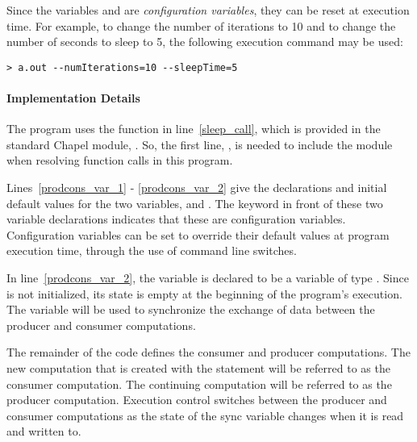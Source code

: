 Since the variables  and  are 
{\em configuration variables}, they can be reset at execution time.
For example, to change the number of iterations to 10
and to change the number of seconds to sleep to 5, the following execution command
may be used:
{\small
\begin{verbatim}
> a.out --numIterations=10 --sleepTime=5
\end{verbatim}}

\paragraph{Implementation Details}
The program uses the  function in line~\ref{sleep_call}, which is 
provided in the
standard Chapel module, .  So, the first line, , 
is needed to include the  module when resolving 
function calls in this program.  

Lines~\ref{prodcons_var_1} - \ref{prodcons_var_2} give the declarations 
and initial default values
for the two variables,  and .
The  keyword in front of these two variable declarations 
indicates that these are configuration variables.  Configuration variables 
can be set to override their default values at program execution time, through the 
use of command line switches.  

In line~\ref{prodcons_var_2}, the variable  is 
declared to be a  variable 
of type .  Since 
is not initialized, its state is empty at the beginning of the program's execution.
The variable  will be used
to synchronize the exchange of data between the producer and consumer computations.

The remainder of the code defines the consumer and producer computations.
The new computation that is created with the  statement will
be referred to as the consumer computation.  The continuing computation
will be referred to as the
producer computation.  Execution control switches between the
producer and consumer computations as the state of the sync variable 
changes when it is read and written to.

